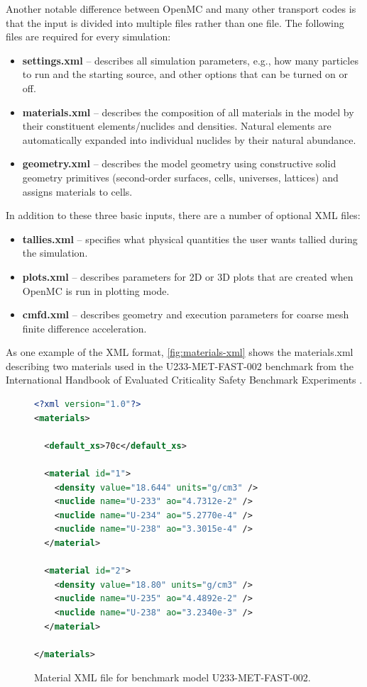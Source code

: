 \documentclass[5p,authoryear]{elsarticle}
\begin{document}
Another notable difference between OpenMC and many other transport codes is that
the input is divided into multiple files rather than one file. The following
files are required for every simulation:
\begin{itemize}
\item \textbf{settings.xml} -- describes all simulation parameters, e.g., how
  many particles to run and the starting source, and other options that can be
  turned on or off.
\item \textbf{materials.xml} -- describes the composition of all materials in
  the model by their constituent elements/nuclides and densities. Natural
  elements are automatically expanded into individual nuclides by their natural
  abundance.
\item \textbf{geometry.xml} -- describes the model geometry using constructive
  solid geometry primitives (second-order surfaces, cells, universes,
  lattices) and assigns materials to cells.
\end{itemize}
In addition to these three basic inputs, there are a number of optional XML
files:
\begin{itemize}
\item \textbf{tallies.xml} -- specifies what physical quantities the user wants
  tallied during the simulation.
\item \textbf{plots.xml} -- describes parameters for 2D or 3D plots that are
  created when OpenMC is run in plotting mode.
\item \textbf{cmfd.xml} -- describes geometry and execution parameters for
  coarse mesh finite difference acceleration.
\end{itemize}
As one example of the XML format, \autoref{fig:materials-xml} shows the
materials.xml describing two materials used in the U233-MET-FAST-002 benchmark
from the International Handbook of Evaluated Criticality Safety Benchmark
Experiments \citep{icsbep-2012}.
\begin{figure}[htb]
  \begin{lstlisting}[language=xml]
<?xml version="1.0"?>
<materials>

  <default_xs>70c</default_xs>

  <material id="1">
    <density value="18.644" units="g/cm3" />
    <nuclide name="U-233" ao="4.7312e-2" />
    <nuclide name="U-234" ao="5.2770e-4" />
    <nuclide name="U-238" ao="3.3015e-4" />
  </material>

  <material id="2">
    <density value="18.80" units="g/cm3" />
    <nuclide name="U-235" ao="4.4892e-2" />
    <nuclide name="U-238" ao="3.2340e-3" />
  </material>

</materials>
  \end{lstlisting}
  \caption{Material XML file for benchmark model U233-MET-FAST-002.}
  \label{fig:materials-xml}
\end{figure}
\end{document}
